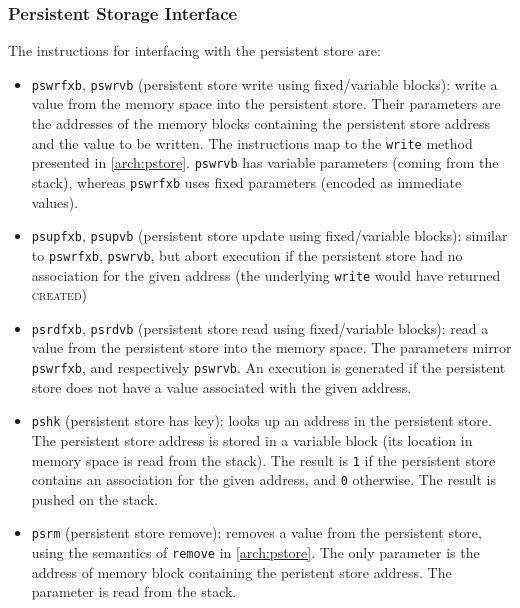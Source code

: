 \subsubsection{Persistent Storage Interface}
The instructions for interfacing with the persistent store are:
\begin{itemize}
  \item \texttt{pswrfxb}, \texttt{pswrvb} (persistent store write using
  fixed/variable blocks): write a value from the memory space into the
  persistent store. Their parameters are the addresses of the memory blocks 
  containing the persistent store address and the value to be written. The
  instructions map to the \texttt{write} method presented in \ref{arch:pstore}.
  \texttt{pswrvb} has variable parameters (coming from the stack), whereas
  \texttt{pswrfxb} uses fixed parameters (encoded as immediate values).
  \item \texttt{psupfxb}, \texttt{psupvb} (persistent store update using
  fixed/variable blocks): similar to \texttt{pswrfxb}, \texttt{pswrvb}, but abort
  execution if the persistent store had no association for the given address (the
  underlying \texttt{write} would have returned \textsc{created})
  \item \texttt{psrdfxb}, \texttt{psrdvb} (persistent store read using
  fixed/variable blocks): read a value from the persistent store into the
  memory space. The parameters mirror \texttt{pswrfxb}, and respectively
  \texttt{pswrvb}. An execution is generated if the persistent store does not
  have a value associated with the given address.
  \item \texttt{pshk} (persistent store has key): looks up an address in the
  persistent store. The persistent store address is stored in a variable block
  (its location in memory space is read from the stack). The result is
  \texttt{1} if the persistent store contains an association for the given
  address, and \texttt{0} otherwise. The result is pushed on the stack.
  \item \texttt{psrm} (persistent store remove): removes a value from
  the persistent store, using the semantics of \texttt{remove} in
  \ref{arch:pstore}. The only parameter is the address of memory block
  containing the peristent store address. The parameter is read from the stack.
\end{itemize}

